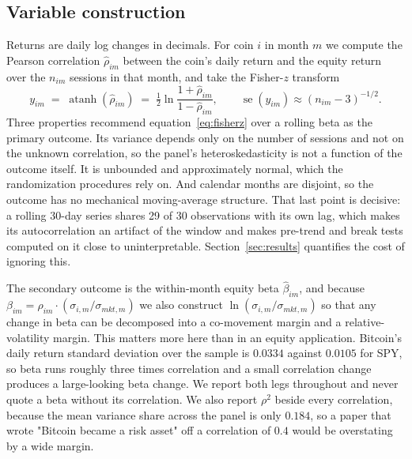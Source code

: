 \documentclass[12pt,a4paper]{article}
\begin{document}
\subsection{Variable construction}

Returns are daily log changes in decimals. For coin $i$ in month $m$ we compute the Pearson correlation $\hat\rho_{im}$ between the coin's daily return and the equity return over the $n_{im}$ sessions in that month, and take the Fisher-$z$ transform
\begin{equation}
y_{im} \;=\; \operatorname{atanh}(\hat\rho_{im}) \;=\; \tfrac{1}{2}\ln\frac{1+\hat\rho_{im}}{1-\hat\rho_{im}},
\qquad \operatorname{se}(y_{im}) \approx (n_{im}-3)^{-1/2}.
\label{eq:fisherz}
\end{equation}
Three properties recommend equation~\eqref{eq:fisherz} over a rolling beta as the primary outcome. Its variance depends only on the number of sessions and not on the unknown correlation, so the panel's heteroskedasticity is not a function of the outcome itself. It is unbounded and approximately normal, which the randomization procedures rely on. And calendar months are disjoint, so the outcome has no mechanical moving-average structure. That last point is decisive: a rolling 30-day series shares 29 of 30 observations with its own lag, which makes its autocorrelation an artifact of the window and makes pre-trend and break tests computed on it close to uninterpretable. Section~\ref{sec:results} quantifies the cost of ignoring this.

The secondary outcome is the within-month equity beta $\hat\beta_{im}$, and because $\beta_{im} = \rho_{im}\cdot(\sigma_{i,m}/\sigma_{mkt,m})$ we also construct $\ln(\sigma_{i,m}/\sigma_{mkt,m})$ so that any change in beta can be decomposed into a co-movement margin and a relative-volatility margin. This matters more here than in an equity application.
Bitcoin's daily return standard deviation over the sample is $0.0334$ against
$0.0105$ for SPY, so beta runs roughly three times correlation and a small correlation change produces a large-looking beta change.
We report both legs throughout and never quote a beta without its correlation. We also report $\rho^2$ beside every correlation, because the mean variance share across the panel is only
$0.184$, so a paper that wrote "Bitcoin became a risk asset" off a correlation of $0.4$ would be overstating by a wide margin.
\end{document}
